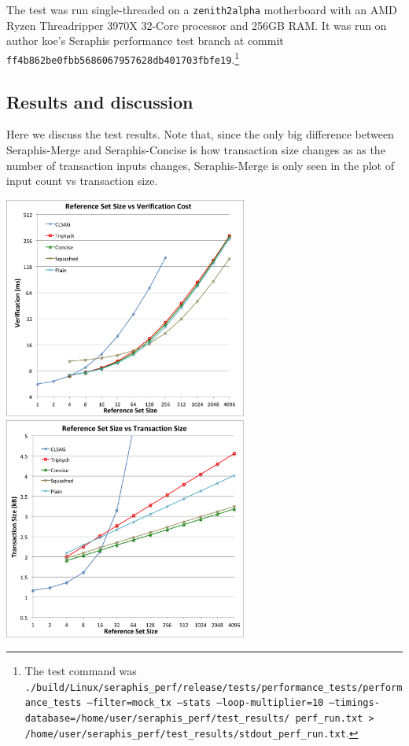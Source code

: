 The test was run single-threaded on a {\tt zenith2alpha} motherboard with an AMD Ryzen Threadripper 3970X 32-Core processor and 256GB RAM. It was run on author koe's Seraphis performance test branch \cite{seraphis-perf-branch} at commit {\tt ff4b862be0fbb5686067957628db401703fbfe19}.\footnote{The test command was {\tt ./build/Linux/seraphis\_perf/release/tests/performance\_tests/performance\_tests --filter=\*mock\_tx\* --stats --loop-multiplier=10 --timings-database=/home/user/seraphis\_perf/test\_results/ perf\_run.txt > /home/user/seraphis\_perf/test\_results/stdout\_perf\_run.txt}.}

\subsection{Results and discussion}
\label{subsec:efficiency-results-discussion}

Here we discuss the test results. Note that, since the only big difference between Seraphis-Merge and Seraphis-Concise is how transaction size changes as as the number of transaction inputs changes, Seraphis-Merge is only seen in the plot of input count vs transaction size.

\begin{center}
    \includegraphics[width=8cm]{figures/refset_1batch_ver.png}
    \includegraphics[width=8cm]{figures/refset_1batch_size.png}
    \label{figure:efficiency-refsetsize-ver}
    \label{figure:efficiency-refsetsize-size}
\end{center}

